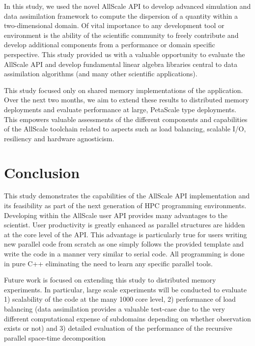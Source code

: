 \documentclass[acmsmall,review,anonymous]{acmart}\settopmatter{printfolios=true,printccs=false,printacmref=false}
\begin{document}
In this study, we used the novel AllScale API to develop advanced simulation and data assimilation framework to compute the dispersion of a quantity within a two-dimensional domain. Of vital importance to any development tool or environment is the ability of the scientific community to freely contribute and develop additional components from a performance or domain specific perspective. This study provided us with a valuable opportunity to evaluate the AllScale API and develop fundamental linear algebra libraries central to data assimilation algorithms (and many other scientific applications). 

This study focused only on shared memory implementations of the application. Over the next two months, we aim to extend these results to distributed memory deployments and evaluate performance at large, PetaScale type deployments. 
This empowers valuable assessments of the different components and capabilities of the AllScale toolchain related to aspects such as load balancing, scalable I/O, resiliency and hardware agnosticism.

\section{Conclusion}
This study demonstrates the capabilities of the AllScale API implementation and its feasibility as part of the next generation of HPC programming environments. Developing within the AllScale user API provides many advantages to the scientist. User productivity is greatly enhanced as parallel structures are hidden at the core level of the API. This advantage is particularly true for users writing new parallel code from scratch as one simply follows the provided template and write the code in a manner very similar to serial code. All programming is done in pure C++ eliminating the need to learn any specific parallel tools. 

Future work is focused on extending this study to distributed memory experiments. In particular, large scale experiments will be conducted to evaluate 1) scalability of the code at the many 1000 core level, 2) performance of load balancing (data assimilation provides a valuable test-case due to the very different computational expense of subdomains depending on whether observation exists or not) and 3) detailed evaluation of the performance of the recursive parallel space-time decomposition

\begin{acks}                            %
\end{acks}



%


\end{document}
